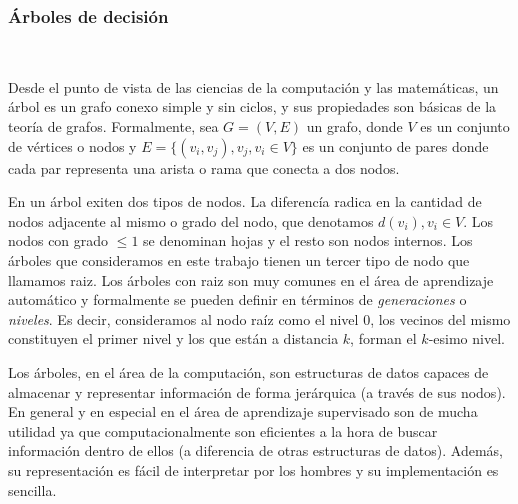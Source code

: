 \subsubsection{Árboles de decisión} ~\\
\label{subsection:arboles_decision}

Desde el punto de vista de las ciencias de la computación y las matemáticas, un
árbol es un grafo conexo simple y sin ciclos, y sus propiedades son básicas de
la teoría de grafos. Formalmente, sea $G=(V,E)$ un grafo, donde $V$ es un
conjunto de vértices o nodos y $E=\{ (v_i, v_j), v_j,v_i \in V \}$ es un
conjunto de pares donde cada par representa una arista o rama que conecta a dos
nodos.


	En un árbol exiten dos tipos de nodos. La diferencía radica en la cantidad de nodos adjacente al mismo o grado del nodo, que denotamos $d(v_i), v_i \in V$. Los nodos con grado $\leq 1$ se denominan hojas y el resto son nodos internos. Los árboles que consideramos en este trabajo tienen un tercer tipo de nodo que llamamos raiz. Los árboles con raiz son muy comunes en el área de aprendizaje automático y formalmente se pueden definir en términos de \textit{generaciones} o \textit{niveles}. Es decir, consideramos al nodo raíz como el nivel 0, los vecinos del mismo constituyen el primer nivel y los que están a distancia $k$, forman el $k$-esimo nivel.

	Los árboles, en el área de la computación, son estructuras de datos capaces de almacenar y representar información de forma jerárquica (a través de sus nodos). En general y en especial en el área de aprendizaje supervisado son de mucha utilidad ya que computacionalmente son eficientes a la hora de buscar información dentro de ellos (a diferencia de otras estructuras de datos). Además, su representación es fácil de interpretar por los hombres y su implementación es sencilla.

